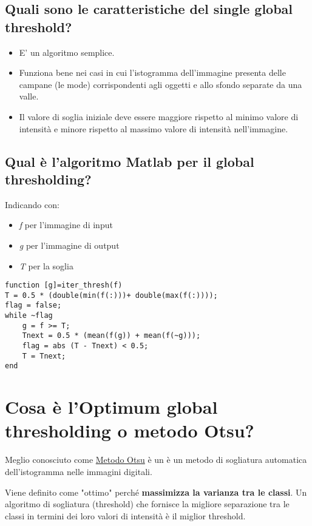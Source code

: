 \subsection{Quali sono le caratteristiche del single global threshold?}
\begin{itemize}
\item E' un algoritmo semplice.
\item Funziona bene nei casi in cui l'istogramma dell'immagine presenta delle campane (le mode) corrispondenti agli oggetti e allo sfondo separate da una valle.
\item Il valore di soglia iniziale deve essere maggiore rispetto al minimo valore di intensità e minore rispetto al massimo valore di intensità nell'immagine.
\end{itemize}

\subsection{Qual è l'algoritmo Matlab per il global thresholding?}
Indicando con:

\begin{itemize}
\item \textit{f} per l'immagine di input
\item \textit{g} per l'immagine di output
\item \textit{T} per la soglia
\end{itemize}

\begin{lstlisting}
function [g]=iter_thresh(f)
T = 0.5 * (double(min(f(:)))+ double(max(f(:))));
flag = false;
while ~flag
	g = f >= T;
	Tnext = 0.5 * (mean(f(g)) + mean(f(~g)));
	flag = abs (T - Tnext) < 0.5;
	T = Tnext;
end
\end{lstlisting}

\section{Cosa è l'Optimum global thresholding o metodo Otsu?} 
Meglio conosciuto come \href{https://en.wikipedia.org/wiki/Otsu\%27s_method}{Metodo Otsu} è un è un metodo di sogliatura automatica dell'istogramma nelle immagini digitali.

Viene definito come "ottimo" perché \textbf{massimizza la varianza tra le classi}. Un algoritmo di sogliatura (threshold) che fornisce la migliore separazione tra le classi in termini dei loro valori di intensità è il miglior threshold.

